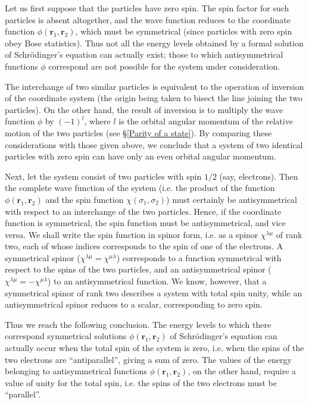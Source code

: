 Let us first suppose that the particles have zero spin. The spin factor for such particles is absent altogether, and the wave function reduces to the coordinate function $ \phi(\bm{r}_1, \bm{r}_2) $, which must be symmetrical (since particles with zero spin obey Bose statistics). Thus not all the energy levels obtained by a formal solution of Schr\"odinger’s equation can actually exist; those to which antisymmetrical functions $\phi$ correspond are not possible for the system under consideration.

The interchange of two similar particles is equivalent to the operation of inversion of the coordinate system (the origin being taken to bisect the line joining the two particles). On the other hand, the result of inversion is to multiply the wave function $\phi$ by $ (-1)^l $, where $ l $ is the orbital angular momentum of the relative motion of the two particles (see \S\ref{Parity of a state}). By comparing these considerations with those given above, we conclude that a system of two identical particles with zero spin can have only an even orbital angular momentum.

Next, let the system consist of two particles with spin $ 1/2 $ (say, electrons). Then the complete wave function of the system (i.e. the product of the function $ \phi(\bm{r}_1, \bm{r}_2) $ and the spin function $ \chi(\sigma_1,\sigma_2) $) must certainly be antisymmetrical with respect to an interchange of the two particles. Hence, if the coordinate function is symmetrical, the spin function must be antisymmetrical, and vice versa. We shall write the spin function in spinor form, i.e. as a spinor $ \chi^{\lambda\mu} $ of rank two, each of whose indices corresponds to the spin of one of the electrons. A symmetrical spinor ($ \chi^{\lambda\mu} = \chi^{\mu\lambda} $) corresponds to a function symmetrical with respect to the spins of the two particles, and an antisymmetrical spinor ($ \chi^{\lambda\mu} = -\chi^{\mu\lambda} $) to an antisymmetrical function. We know, however, that a symmetrical spinor of rank two describes a system with total spin unity, while an antisymmetrical spinor reduces to a scalar, corresponding to zero spin.

Thus we reach the following conclusion. The energy levels to which there correspond symmetrical solutions $ \phi(\bm{r}_1, \bm{r}_2) $ of Schr\"odinger’s equation can actually occur when the total spin of the system is zero, i.e. when the spins of the two electrons are “antiparallel”, giving a sum of zero. The values of the energy belonging to antisymmetrical functions $ \phi(\bm{r}_1, \bm{r}_2) $, on the other hand, require a value of unity for the total spin, i.e. the spins of the two electrons must be “parallel”.

